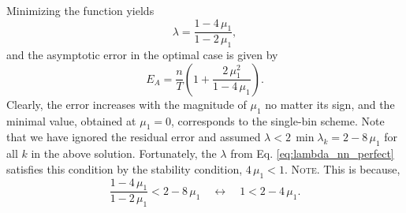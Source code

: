 \documentclass[reprint, floatfix]{revtex4-1}
\newcommand{\note}[1]{{\color{DarkGreen}\footnotesize \textsc{Note.} #1}}
\newcommand{\Err}{E}
\begin{document}
%
Minimizing the function yields
%
\begin{equation}
\lambda = \frac{1 - 4 \, \mu_1} { 1 - 2 \, \mu_1 },
\label{eq:lambda_nn_perfect}
\end{equation}
%
and the asymptotic error in the optimal case is given by
%
\begin{equation}
\Err_A
=
\frac{n}{T}
\left(
  1+ \frac{2 \, \mu_1^2}{1-4 \, \mu_1}
\right).
\label{eq:error_nn_prefect}
\end{equation}
%
Clearly, the error
increases with the magnitude of $\mu_1$
no matter its sign,
and the minimal value, obtained at $\mu_1 = 0$,
corresponds to the single-bin scheme.
%
Note that we have ignored the residual error
and assumed $\lambda < 2 \, \min \lambda_k = 2 - 8 \, \mu_1$
for all $k$ in the above solution.
%
Fortunately,
the $\lambda$ from Eq. \eqref{eq:lambda_nn_perfect}
satisfies this condition
by the stability condition,
$4 \, \mu_1 < 1$.
\note{This is because,
$$
\frac{ 1 - 4 \, \mu_1 } { 1 - 2 \, \mu_1 } < 2 - 8 \, \mu_1
\quad \leftrightarrow \quad
1 < 2 - 4 \, \mu_1.
$$
}
\end{document}
